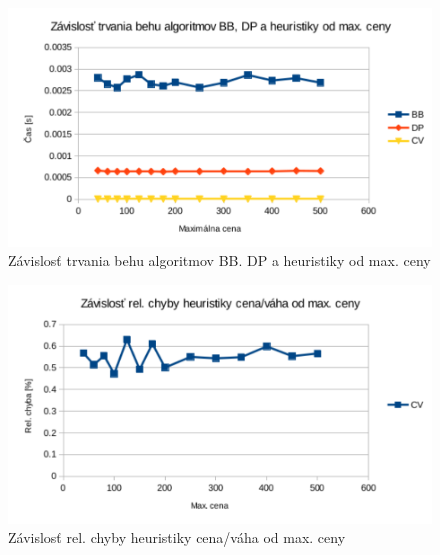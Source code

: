 \documentclass[slovak]{article}
\begin{document}
\begin{figure}[htb!]\centering
	\includegraphics[scale=0.8]{./3_3.pdf}
	\caption{Závislosť trvania behu algoritmov BB. DP a heuristiky od max. ceny }
	\label{gr:graf3}
\end{figure}

\begin{figure}[htb!]\centering
	\includegraphics[scale=0.8]{./3_4.pdf}
	\caption{Závislosť rel. chyby heuristiky cena/váha od max. ceny}
	\label{gr:graf4}
\end{figure}
\end{document}
